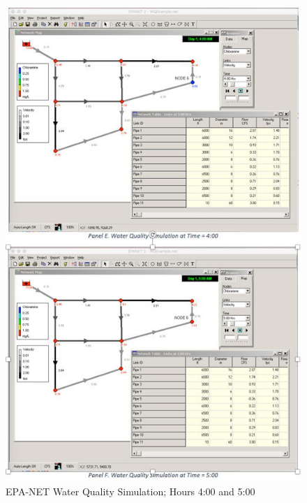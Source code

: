\documentclass[11pt]{article}
\begin{document}
\begin{enumerate}
\begin{figure}[ht!] %
\centering
   \includegraphics[width=4.5in]{WaterQuality-3.jpg}
     \caption{EPA-NET Water Quality Simulation; Hours 4:00 and 5:00}
   \label{fig:waterQ3} 
\end{figure}
\clearpage


\end{enumerate}



\end{document}
